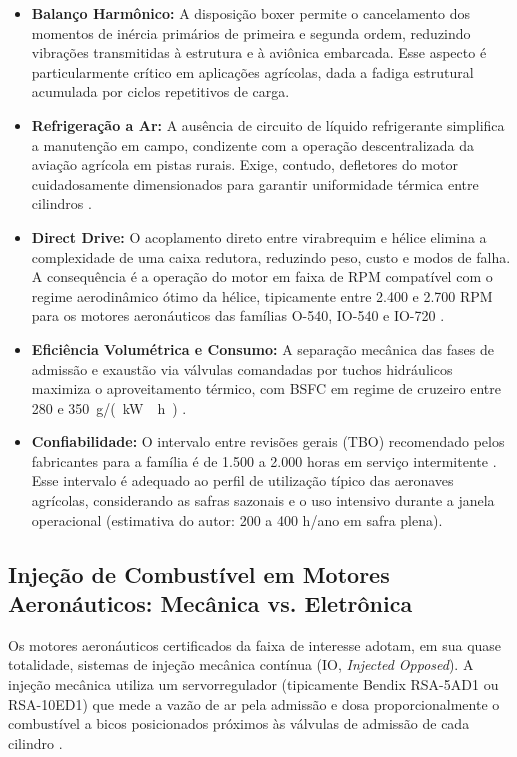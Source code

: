 \documentclass[a4paper,12pt]{article}
\begin{document}
\begin{itemize}
    \item \textbf{Balanço Harmônico:} A disposição boxer permite o cancelamento dos momentos de inércia primários de primeira e segunda ordem, reduzindo vibrações transmitidas à estrutura e à aviônica embarcada. Esse aspecto é particularmente crítico em aplicações agrícolas, dada a fadiga estrutural acumulada por ciclos repetitivos de carga.
    \item \textbf{Refrigeração a Ar:} A ausência de circuito de líquido refrigerante simplifica a manutenção em campo, condizente com a operação descentralizada da aviação agrícola em pistas rurais. Exige, contudo, defletores do motor cuidadosamente dimensionados para garantir uniformidade térmica entre cilindros \cite{lycomingmanual, io360manual}.
    \item \textbf{Direct Drive:} O acoplamento direto entre virabrequim e hélice elimina a complexidade de uma caixa redutora, reduzindo peso, custo e modos de falha. A consequência é a operação do motor em faixa de RPM compatível com o regime aerodinâmico ótimo da hélice, tipicamente entre 2.400 e 2.700 RPM para os motores aeronáuticos das famílias O-540, IO-540 e IO-720 \cite{lycomingmanual, lycoming_io720}.
    \item \textbf{Eficiência Volumétrica e Consumo:} A separação mecânica das fases de admissão e exaustão via válvulas comandadas por tuchos hidráulicos maximiza o aproveitamento térmico, com BSFC em regime de cruzeiro entre 280 e \SI{350}{g/(kW \cdot h)} \cite{lycomingmanual, io360manual}.
    \item \textbf{Confiabilidade:} O intervalo entre revisões gerais (TBO) recomendado pelos fabricantes para a família é de 1.500 a 2.000 horas em serviço intermitente \cite{lycomingmanual}. Esse intervalo é adequado ao perfil de utilização típico das aeronaves agrícolas, considerando as safras sazonais e o uso intensivo durante a janela operacional (estimativa do autor: 200 a 400 h/ano em safra plena).
\end{itemize}

\subsection{Injeção de Combustível em Motores Aeronáuticos: Mecânica vs. Eletrônica}

Os motores aeronáuticos certificados da faixa de interesse adotam, em sua quase totalidade, sistemas de injeção mecânica contínua (IO, \textit{Injected Opposed}). A injeção mecânica utiliza um servorregulador (tipicamente Bendix RSA-5AD1 ou RSA-10ED1) que mede a vazão de ar pela admissão e dosa proporcionalmente o combustível a bicos posicionados próximos às válvulas de admissão de cada cilindro \cite{io360manual}.
\end{document}
